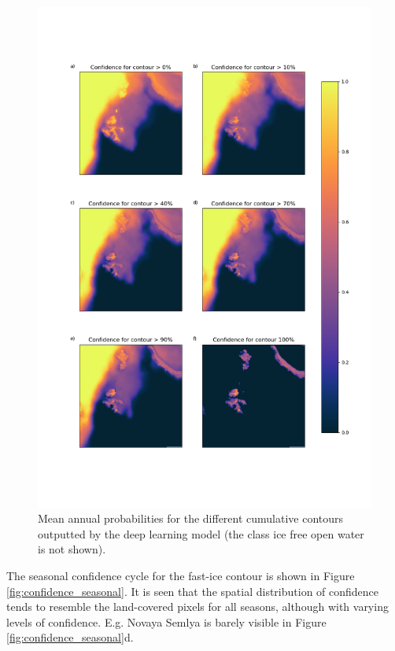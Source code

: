 \documentclass[../main/thesis.tex]{subfiles}
\begin{document}
\begin{figure}
    \centering
    \includegraphics[width=.8\textwidth]{confidence_mean_annual}
    \caption{\label{fig:mean_annual_confidence}Mean annual probabilities for the different cumulative contours outputted by the deep learning model (the class ice free open water is not shown).}
\end{figure}

The seasonal confidence cycle for the fast-ice contour is shown in Figure \ref{fig:confidence_seasonal}. It is seen that the spatial distribution of confidence tends to resemble the land-covered pixels for all seasons, although with varying levels of confidence. E.g. Novaya Semlya is barely visible in Figure \ref{fig:confidence_seasonal}d.
\end{document}

